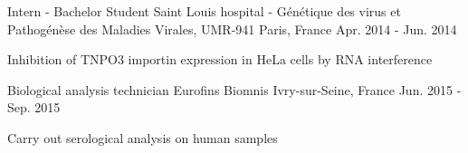 \begin{cventries}
  \cventry
    {Intern - Bachelor Student} %
    {Saint Louis hospital - Génétique des virus et Pathogénèse des Maladies Virales, UMR-941} %
    {Paris, France} %
    {Apr. 2014 - Jun. 2014} %
    {
      \begin{cvitems} %
        \item {Inhibition of TNPO3 importin expression in HeLa cells by RNA interference}
      \end{cvitems}
    }

  \cventry
    {Biological analysis technician} %
    {Eurofins Biomnis} %
    {Ivry-sur-Seine, France} %
    {Jun. 2015 - Sep. 2015} %
    {
      \begin{cvitems} %
        \item {Carry out serological analysis on human samples}
      \end{cvitems}
    }
    
\end{cventries}

